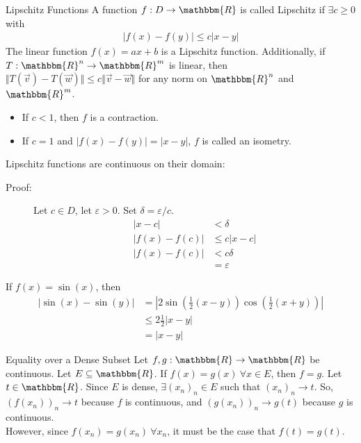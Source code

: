 \documentclass[10pt]{extarticle}
\newcommand{\R}{\mathbbm{R}}
\begin{document}
  \begin{problem}{Lipschitz Functions}
    A function $f: D\rightarrow \R$ is called Lipschitz if $\exists c \geq 0$ with 
    \begin{align*}
      |f(x) - f(y)| \leq c|x-y| \tag*{$\forall x,y\in D$}
    \end{align*}
    The linear function $f(x) = ax + b$ is a Lipschitz function. Additionally, if $T: \R^n \rightarrow \R^m$ is linear, then $\Vert T(\vec{v}) - T(\vec{w})\Vert \leq c\Vert \vec{v}-\vec{w}\Vert$ for any norm on $\R^n$ and $\R^m$.
    \begin{itemize}
      \item If $c < 1$, then $f$ is a contraction.
      \item If $c = 1$ and $|f(x) - f(y)| = |x-y|$, $f$ is called an isometry.
    \end{itemize}
    Lipschitz functions are continuous on their domain:
    \begin{description}
      \item[Proof:] Let $c\in D$, let $\varepsilon > 0$. Set $\delta = \varepsilon/c$.
        \begin{align*}
          |x-c| &< \delta\\
          |f(x) - f(c)| &\leq c|x-c|\\
          |f(x) - f(c)| &< c\delta\\
                        &= \varepsilon
        \end{align*}
    \end{description}
    If $f(x) = \sin(x)$, then
    \begin{align*}
      |\sin(x) - \sin(y)| &= \left|2\sin\left(\frac{1}{2}(x-y)\right)\cos\left(\frac{1}{2}(x+y)\right)\right|\\
                          &\leq 2\frac{1}{2}|x-y|\\
                          &= |x-y|
    \end{align*}
  \end{problem}
  \begin{problem}{Equality over a Dense Subset}
    Let $f,g: \R\rightarrow\R$ be continuous. Let $E\subseteq \R$. If $f(x) = g(x)~\forall x\in E$, then $f = g$.
    \tcblower
    Let $t\in\R$. Since $E$ is dense, $\exists (x_n)_n \in E$ such that $(x_n)_n \rightarrow t$. So, $(f(x_n))_n \rightarrow t$ because $f$ is continuous, and $(g(x_n))_n \rightarrow g(t)$ because $g$ is continuous.\\

    However, since $f(x_n) = g(x_n)~\forall x_n$, it must be the case that $f(t) = g(t)$.
  \end{problem}
\end{document}
